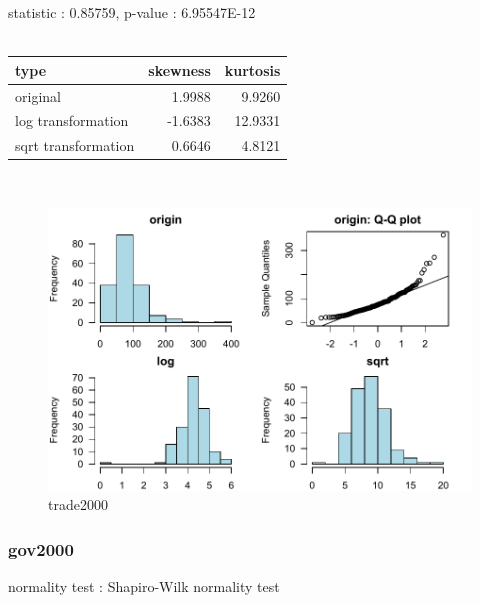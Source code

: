 \documentclass{book}\usepackage[]{graphicx}\usepackage[]{color}
\begin{document}
\noindent statistic : 0.85759,  p-value : 6.95547E-12\\
\\%
\begin{tabular}{lrr}
  \toprule
type & skewness & kurtosis \\ 
  \midrule
original & 1.9988 & 9.9260 \\ 
  log transformation & -1.6383 & 12.9331 \\ 
  sqrt transformation & 0.6646 & 4.8121 \\ 
   \bottomrule
\end{tabular}
\\
\begin{figure}[!ht]
\centering
\includegraphics[width=1.0\textwidth]{figure/norm10.pdf}
\caption{trade2000}
\end{figure}
\clearpage
\subsubsection{ gov2000 }

normality test : Shapiro-Wilk normality test
\end{document}

